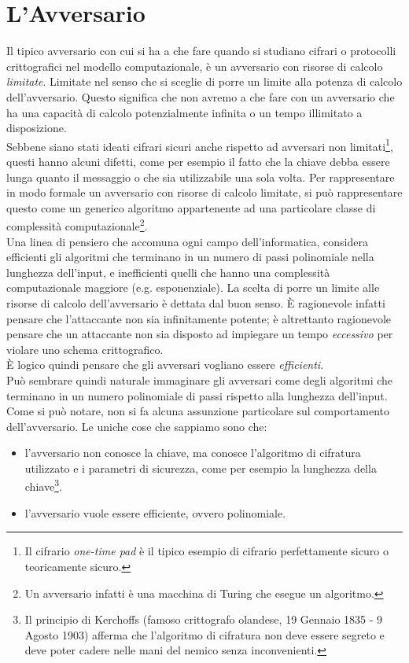 \documentclass[a4paper,openright,twoside,12pt]{report}
\begin{document}
\section{L'Avversario}
Il tipico avversario con cui si ha a che fare quando si studiano cifrari o protocolli crittografici nel modello computazionale,
è un avversario con risorse di calcolo \emph{limitate}. Limitate nel senso che si sceglie di porre un limite alla potenza di calcolo dell'avversario.
Questo significa che non avremo a che fare con un avversario che ha una capacit\`a di calcolo potenzialmente infinita o un tempo illimitato a disposizione.\\
Sebbene siano stati ideati cifrari sicuri anche rispetto ad avversari non limitati\footnote{Il cifrario \emph{one-time pad} \`e il tipico esempio di cifrario perfettamente sicuro o teoricamente sicuro.}, 
questi hanno alcuni difetti, come per esempio
il fatto che la chiave debba essere lunga quanto il messaggio o che sia utilizzabile una sola volta.
Per rappresentare in modo formale un avversario con risorse di calcolo limitate, si pu\`o rappresentare questo come un generico algoritmo appartenente ad una 
particolare classe di complessit\`a computazionale\footnote{Un avversario infatti \`e una macchina di Turing che esegue un algoritmo.}. \\
Una linea di pensiero che accomuna ogni campo dell'informatica, considera efficienti gli algoritmi che terminano in un numero di passi polinomiale nella lunghezza dell'input, e inefficienti 
quelli che hanno una complessit\`a computazionale maggiore (e.g. esponenziale). 
La scelta di porre un limite alle risorse di calcolo dell'avversario \`e dettata dal buon senso.
\`E ragionevole infatti pensare che l'attaccante non sia infinitamente potente; \`e altrettanto ragionevole pensare che un attaccante non sia disposto ad impiegare un tempo \emph{eccessivo} per violare uno schema crittografico.\\
\`E logico quindi pensare che gli avversari vogliano essere \emph{efficienti}.\\
Pu\`o sembrare quindi naturale immaginare gli avversari come degli algoritmi che terminano in un numero polinomiale di passi
rispetto alla lunghezza dell'input. Come si pu\`o notare, non si fa alcuna assunzione particolare sul comportamento dell'avversario. Le uniche cose che sappiamo sono che:
\begin{itemize}
 \item l'avversario non conosce la chiave, ma conosce l'algoritmo di cifratura utilizzato  e i parametri di sicurezza, come per esempio la lunghezza della chiave\footnote{Il principio di Kerchoffs 
(famoso crittografo olandese, 19 Gennaio 1835 - 9 Agosto 1903) afferma che
l'algoritmo di cifratura non deve essere segreto e deve poter cadere nelle mani del nemico senza inconvenienti.}. 
 \item l'avversario vuole essere efficiente, ovvero polinomiale.
\end{itemize}
\end{document}

